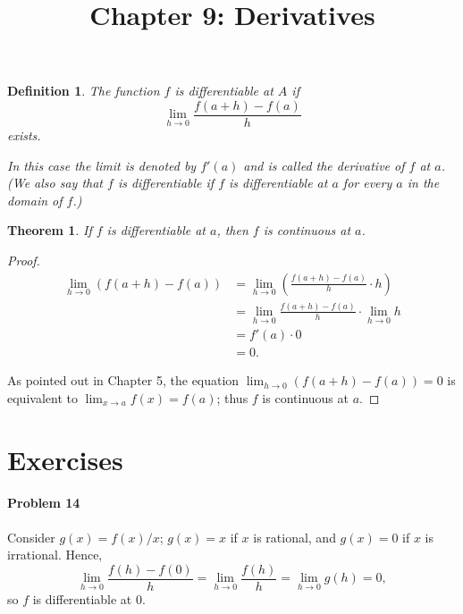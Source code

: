 \documentclass{article}
\newtheorem{definition}{Definition}
\newtheorem{theorem}{Theorem}
\begin{document}
\title{Chapter 9: Derivatives}
\maketitle

\begin{definition}
  The function $f$ is \emph{differentiable at $A$} if \[
    \lim_{h \to 0}\frac{f(a + h) - f(a)}{h}
  \] exists.

  In this case the limit is denoted by $f'(a)$ and is called the
  \emph{derivative of $f$ at $a$}. (We also say that $f$ is
  \emph{differentiable} if $f$ is differentiable at $a$ for every $a$ in the
  domain of $f$.)
\end{definition}

\begin{theorem}
  If $f$ is differentiable at $a$, then $f$ is continuous at $a$.
\end{theorem}
\begin{proof}
  \begin{align*}
    \lim_{h \to 0} (f(a + h) - f(a))
    &= \lim_{h \to 0} \left( \frac{f(a + h) - f(a)}{h} \cdot h \right) \\
    &= \lim_{h \to 0} \frac{f(a + h) - f(a)}{h} \cdot \lim_{h \to 0} h \\
    &= f'(a) \cdot 0 \\
    &= 0.
  \end{align*}

  As pointed out in Chapter 5, the equation $\lim_{h \to 0} (f(a + h) - f(a)) =
  0$ is equivalent to $\lim_{x \to a} f(x) = f(a)$; thus $f$ is continuous at
  $a$.
\end{proof}

\section*{Exercises}

\paragraph{Problem 14} Consider $g(x) = f(x)/x$; $g(x) = x$ if $x$ is rational,
and $g(x) = 0$ if $x$ is irrational. Hence, \[
  \lim_{h \to 0} \frac{f(h) - f(0)}{h}
  = \lim_{h \to 0} \frac{f(h)}{h}
  = \lim_{h \to 0} g(h) = 0,
\] so $f$ is differentiable at 0.
\end{document}
